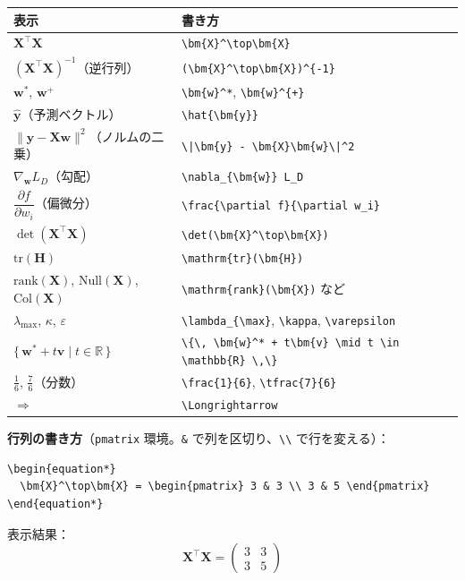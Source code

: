 \documentclass[a4paper,dvipdfmx]{jsarticle}
\newcommand{\提出期限}{2026年10月26日（月）}
\newcommand{\学籍番号}{0000000}
\newcommand{\氏名}{氏名を書く}
\newcommand{\提出日}{2026年10月26日}
\begin{document}
\begin{center}
\small
\begin{tabular}{l|l}
\hline
表示 & 書き方 \\
\hline\hline
$\bm{X}^\top\bm{X}$ & \verb|\bm{X}^\top\bm{X}| \\
$(\bm{X}^\top\bm{X})^{-1}$（逆行列） & \verb|(\bm{X}^\top\bm{X})^{-1}| \\
$\bm{w}^*$, $\bm{w}^{+}$ & \verb|\bm{w}^*|, \verb|\bm{w}^{+}| \\
$\hat{\bm{y}}$（予測ベクトル） & \verb|\hat{\bm{y}}| \\
$\|\bm{y} - \bm{X}\bm{w}\|^2$（ノルムの二乗） & \verb+\|\bm{y} - \bm{X}\bm{w}\|^2+ \\
$\nabla_{\bm{w}} L_D$（勾配） & \verb|\nabla_{\bm{w}} L_D| \\
$\dfrac{\partial f}{\partial w_i}$（偏微分） & \verb|\frac{\partial f}{\partial w_i}| \\
$\det(\bm{X}^\top\bm{X})$ & \verb|\det(\bm{X}^\top\bm{X})| \\
$\mathrm{tr}(\bm{H})$ & \verb|\mathrm{tr}(\bm{H})| \\
$\mathrm{rank}(\bm{X})$, $\mathrm{Null}(\bm{X})$, $\mathrm{Col}(\bm{X})$ & \verb|\mathrm{rank}(\bm{X})| など \\
$\lambda_{\max}$, $\kappa$, $\varepsilon$ & \verb|\lambda_{\max}|, \verb|\kappa|, \verb|\varepsilon| \\
$\{\, \bm{w}^* + t\bm{v} \mid t \in \mathbb{R} \,\}$ & \verb|\{\, \bm{w}^* + t\bm{v} \mid t \in \mathbb{R} \,\}| \\
$\frac{1}{6}$, $\tfrac{7}{6}$（分数） & \verb|\frac{1}{6}|, \verb|\tfrac{7}{6}| \\
$\Longrightarrow$ & \verb|\Longrightarrow| \\
\hline
\end{tabular}
\end{center}

\noindent
\textbf{行列の書き方}（\verb|pmatrix| 環境。\verb|&| で列を区切り、\verb|\\| で行を変える）：
\begin{verbatim}
\begin{equation*}
  \bm{X}^\top\bm{X} = \begin{pmatrix} 3 & 3 \\ 3 & 5 \end{pmatrix}
\end{equation*}
\end{verbatim}
表示結果：
\begin{equation*}
  \bm{X}^\top\bm{X} = \begin{pmatrix} 3 & 3 \\ 3 & 5 \end{pmatrix}
\end{equation*}
\end{document}

